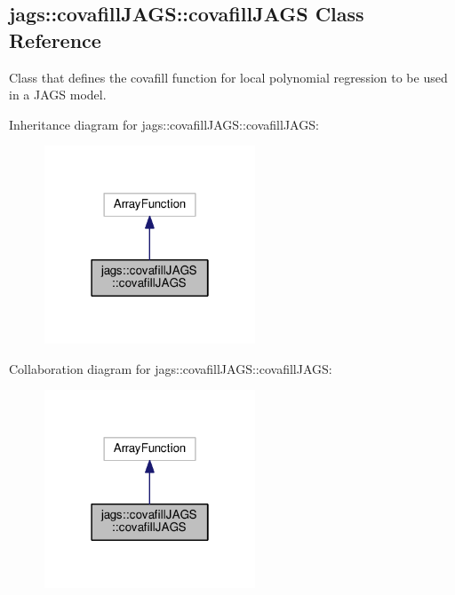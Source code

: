 \hypertarget{classjags_1_1covafillJAGS_1_1covafillJAGS}{}\subsection{jags\+:\+:covafill\+J\+A\+G\+S\+:\+:covafill\+J\+A\+G\+S Class Reference}
\label{classjags_1_1covafillJAGS_1_1covafillJAGS}


Class that defines the covafill function for local polynomial regression to be used in a J\+A\+G\+S model.  




Inheritance diagram for jags\+:\+:covafill\+J\+A\+G\+S\+:\+:covafill\+J\+A\+G\+S\+:\nopagebreak
\begin{figure}[H]
\begin{center}
\leavevmode
\includegraphics[width=178pt]{classjags_1_1covafillJAGS_1_1covafillJAGS__inherit__graph}
\end{center}
\end{figure}


Collaboration diagram for jags\+:\+:covafill\+J\+A\+G\+S\+:\+:covafill\+J\+A\+G\+S\+:\nopagebreak
\begin{figure}[H]
\begin{center}
\leavevmode
\includegraphics[width=178pt]{classjags_1_1covafillJAGS_1_1covafillJAGS__coll__graph}
\end{center}
\end{figure}
